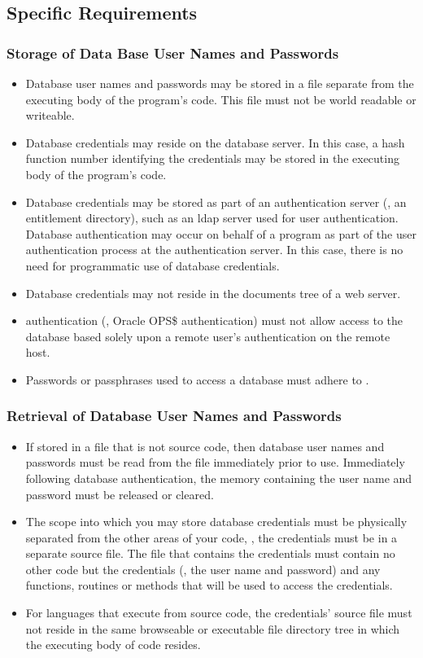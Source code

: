\subsection{Specific Requirements }

\subsubsection{Storage of Data Base User Names and Passwords}
\begin{itemize}
\item 
Database user names and passwords may be stored in a file separate from the executing body of the program's code.  
This file must not be world readable or writeable.
\item
Database credentials may reside on the database server.  
In this case, a hash function number identifying the credentials may be stored in the executing body of the program's code. 
\item
Database credentials may be stored as part of an authentication server (\ie, an entitlement directory), such as an \gls{ldap} server used for user authentication.  
Database authentication may occur on behalf of a program as part of the user authentication process at the authentication server.  
In this case, there is no need for programmatic use of database credentials. 
\item
Database credentials may not reside in the documents tree of a web server. 
\item
\Passthrough{} authentication (\ie, Oracle OPS\$ authentication) must not allow access to the database based solely upon a remote user's authentication on the remote host. 
\item
Passwords or passphrases used to access a database must adhere to . 
\end{itemize}
\subsubsection{Retrieval of Database User Names and Passwords}
\begin{itemize}
\item
If stored in a file that is not source code, then database user names and passwords must be read from the file immediately prior to use.  
Immediately following database authentication, the memory containing the user name and password must be released or cleared. 
\item
The scope into which you may store database credentials must be physically separated from the other areas of your code, \eg, the credentials\ins{,} must be in a separate source file.  
The file that contains the credentials must contain no other code but the credentials (\ie, the user name and password) and any functions, routines\oxford{} or methods that will be used to access the credentials. 
\item
For languages that execute from source code, the credentials' source file must not reside in the same browseable or executable file directory tree in which the executing body of code resides. 
\end{itemize}
